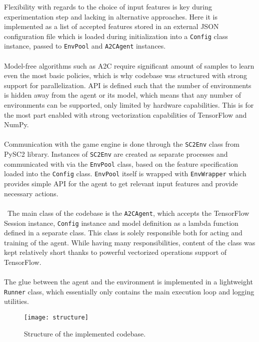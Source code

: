 Flexibility with regards to the choice of input features is key during experimentation step and lacking in alternative approaches. Here it is implemented as a list of accepted features stored in an external JSON configuration file which is loaded during initialization into a \texttt{Config} class instance, passed to \texttt{EnvPool} and \texttt{A2CAgent} instances.
\\\\
Model-free algorithms such as A2C require significant amount of samples to learn even the most basic policies, which is why codebase was structured with strong support for parallelization. API is defined such that the number of environments is hidden away from the agent or its model, which means that any number of environments can be supported, only limited by hardware capabilities. This is for the most part enabled with strong vectorization capabilities of TensorFlow and NumPy.
\\\\
Communication with the game engine is done through the \texttt{SC2Env} class from PySC2 library. Instances of \texttt{SC2Env} are created as separate processes and communicated with via the \texttt{EnvPool} class, based on the feature specification loaded into the \texttt{Config} class. \texttt{EnvPool} itself is wrapped with \texttt{EnvWrapper} which provides simple API for the agent to get relevant input features and provide necessary actions.
\\\\\
The main class of the codebase is the \texttt{A2CAgent}, which accepts the TensorFlow Session instance, \texttt{Config} instance and model definition as a lambda function defined in a separate class. This class is solely responsible both for acting and training of the agent. While having many responsibilities, content of the class was kept relatively short thanks to powerful vectorized operations support of TensorFlow.
\\\\
The glue between the agent and the environment is implemented in a lightweight \texttt{Runner} class, which essentially only contains the main execution loop and logging utilities.

\begin{figure}[ht]
\begin{center}
\texttt{[image: structure]}
\caption{Structure of the implemented codebase.}
\label{fig:structure}
\end{center}
\end{figure}